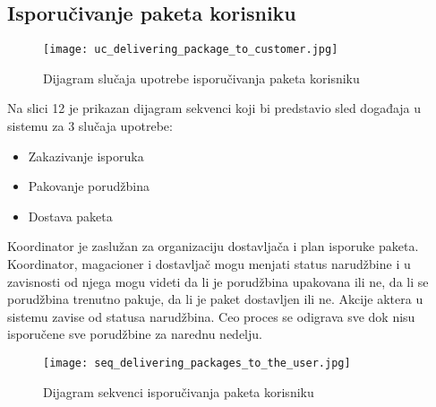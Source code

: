 \subsection{Isporučivanje paketa korisniku}
\begin{figure}[H]
	\begin{center}
		\texttt{[image: uc\_delivering\_package\_to\_customer.jpg]}
	\end{center}
    \caption{Dijagram slučaja upotrebe isporučivanja paketa korisniku}
\end{figure}

Na slici 12 je prikazan dijagram sekvenci koji bi predstavio sled događaja u sistemu za 3 slučaja upotrebe: 
\begin{itemize}
	\item{Zakazivanje isporuka}
	\item{Pakovanje porudžbina }
	\item{Dostava paketa}
\end{itemize}

Koordinator je zaslužan za organizaciju dostavljača i plan isporuke paketa. Koordinator, magacioner i dostavljač mogu menjati status narudžbine i u zavisnosti od njega mogu videti da li je porudžbina upakovana ili ne, da li se porudžbina trenutno pakuje, da li je paket dostavljen ili ne. Akcije aktera u sistemu zavise od statusa narudžbina. Ceo proces se odigrava sve dok nisu isporučene sve porudžbine za narednu nedelju.
\begin{figure}[H]
	\begin{center}
		\texttt{[image: seq\_delivering\_packages\_to\_the\_user.jpg]}
	\end{center}
    \caption{Dijagram sekvenci isporučivanja paketa korisniku}
\end{figure}


